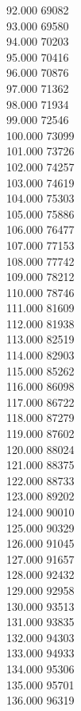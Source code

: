 { 92.000	69082 \\
 93.000	69580 \\
 94.000	70203 \\
 95.000	70416 \\
 96.000	70876 \\
 97.000	71362 \\
 98.000	71934 \\
 99.000	72546 \\
 100.000	73099 \\
 101.000	73726 \\
 102.000	74257 \\
 103.000	74619 \\
 104.000	75303 \\
 105.000	75886 \\
 106.000	76477 \\
 107.000	77153 \\
 108.000	77742 \\
 109.000	78212 \\
 110.000	78746 \\
 111.000	81609 \\
 112.000	81938 \\
 113.000	82519 \\
 114.000	82903 \\
 115.000	85262 \\
 116.000	86098 \\
 117.000	86722 \\
 118.000	87279 \\
 119.000	87602 \\
 120.000	88024 \\
 121.000	88375 \\
 122.000	88733 \\
 123.000	89202 \\
 124.000	90010 \\
 125.000	90329 \\
 126.000	91045 \\
 127.000	91657 \\
 128.000	92432 \\
 129.000	92958 \\
 130.000	93513 \\
 131.000	93835 \\
 132.000	94303 \\
 133.000	94933 \\
 134.000	95306 \\
 135.000	95701 \\
 136.000	96319 \\
}

